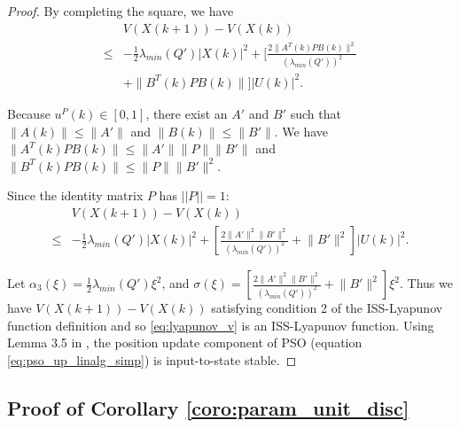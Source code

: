 \documentclass{sig-alternate}
\begin{document}
\begin{proof}
By completing the square, we have
\begin{equation}
\label{eq:lyapunov_delta4}
\begin{aligned}
& V( X(k+1) ) - V( X(k) ) \\
	\leq & - \frac{1}{2} \lambda_{min}(Q') | X(k) |^{2} + [ \frac{2 \lVert A^{T}(k) P B(k) \rVert^{2}}{ ( \lambda_{min}(Q') )^{2} } \\
	& + \lVert B^{T}(k) P B(k) \rVert ] | U(k) |^{2}. 
\end{aligned}
\end{equation}
		
Because $ u^{P}(k) \in [0, 1] $, there exist an $ A' $ and $ B' $ such that $ \lVert A(k) \rVert \leq \lVert A' \rVert $ and $ \lVert B(k) \rVert \leq \lVert B' \rVert $.
We have $ \lVert A^{T}(k) P B(k) \rVert \leq \lVert A' \rVert \lVert P \rVert \lVert B' \rVert $ and $ \lVert B^{T}(k) P B(k) \rVert \leq \lVert P \rVert \lVert B' \rVert^{2} $.
		
Since the identity matrix $ P $ has $ || P || = 1 $:
\begin{equation}
\label{eq:lyapunov_delta5}
\begin{aligned}
& V( X(k+1) ) - V( X(k) ) \\
	\leq & - \frac{1}{2} \lambda_{min}(Q') | X(k) |^{2} + [ \frac{2 \lVert A' \rVert^{2} \lVert B' \rVert^{2}}{ ( \lambda_{min}(Q') )^{2} } + \lVert B' \rVert^{2} ] | U(k) |^{2}.
\end{aligned}
\end{equation}
		
Let
$ \alpha_{3} ( \xi )= \frac{1}{2} \lambda_{min}(Q') \xi^{2} $,
and
$ \sigma ( \xi ) = [ \frac{2 \lVert A' \rVert^{2} \lVert B' \rVert^{2}}{ ( \lambda_{min}(Q') )^{2} } +  \lVert B' \rVert^{2} ] \xi^{2} $.
Thus we have $  V( X(k+1) ) - V( X(k) ) $ satisfying condition 2 of the ISS-Lyapunov function definition and
so \eqref{eq:lyapunov_v} is an ISS-Lyapunov function.
Using Lemma 3.5 in \cite{Jiang2001857}, the position update component of PSO (equation \eqref{eq:pso_up_linalg_simp}) is input-to-state stable.
\end{proof}

\subsection{Proof of Corollary \ref{coro:param_unit_disc}}
\label{sec:coro:param_unit_disc:proof}
\end{document}
